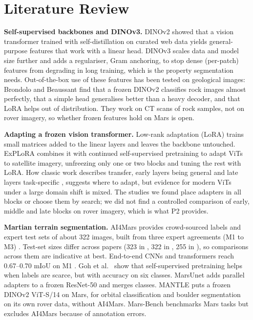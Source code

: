\documentclass[conference]{IEEEtran}
\begin{document}
\section{Literature Review}\label{sec:related}
\textbf{Self-supervised backbones and DINOv3.} DINOv2 \cite{oquab2023dinov2} showed that a vision transformer trained with self-distillation on curated web data yields general-purpose features that work with a linear head. DINOv3 \cite{simeoni2025dinov3} scales data and model size further and adds a regulariser, Gram anchoring, to stop dense (per-patch) features from degrading in long training, which is the property segmentation needs. Out-of-the-box use of these features has been tested on geological images: Brondolo and Beaussant \cite{brondolo2024dinov2rocks} find that a frozen DINOv2 classifies rock images almost perfectly, that a simple head generalises better than a heavy decoder, and that LoRA helps out of distribution. They work on CT scans of rock samples, not on rover imagery, so whether frozen features hold on Mars is open.

\textbf{Adapting a frozen vision transformer.} Low-rank adaptation (LoRA) \cite{hu2022lora} trains small matrices added to the linear layers and leaves the backbone untouched. ExPLoRA \cite{khanna2024explora} combines it with continued self-supervised pretraining to adapt ViTs to satellite imagery, unfreezing only one or two blocks and tuning the rest with LoRA. How classic work describes transfer, early layers being general and late layers task-specific \cite{yosinski2014transferable}, suggests where to adapt, but evidence for modern ViTs under a large domain shift is mixed. The studies we found place adapters in all blocks or choose them by search; we did not find a controlled comparison of early, middle and late blocks on rover imagery, which is what P2 provides.

\textbf{Martian terrain segmentation.} AI4Mars provides crowd-sourced labels and expert test sets of about 322 images, built from three expert agreements (M1 to M3) \cite{swan2021ai4mars}. Test-set sizes differ across papers (323 in \cite{swan2021ai4mars}, 322 in \cite{goh2022less}, 255 in \cite{mohammad2024}), so comparisons across them are indicative at best. End-to-end CNNs and transformers reach 0.67--0.70 mIoU on M1 \cite{mohammad2025}. Goh et al.\ \cite{goh2022less} show that self-supervised pretraining helps when labels are scarce, but with accuracy on six classes. MarsUnet \cite{dai2026marsunet} adds parallel adapters to a frozen ResNet-50 and merges classes. MANTLE \cite{durai2026mantle} puts a frozen DINOv2 ViT-S/14 on Mars, for orbital classification and boulder segmentation on its own rover data, without AI4Mars. Mars-Bench \cite{purohit2025marsbench} benchmarks Mars tasks but excludes AI4Mars because of annotation errors.
\end{document}
